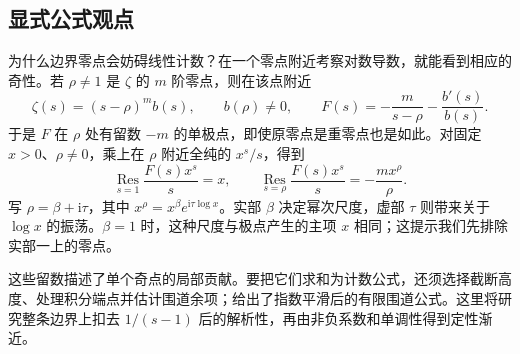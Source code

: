 \subsection{显式公式观点}
\label{b3:subsec:270203}

为什么边界零点会妨碍线性计数？在一个零点附近考察对数导数，就能看到相应的奇性。若 \(\rho\ne1\) 是 \(\zeta\) 的 \(m\) 阶零点，则在该点附近
\[
 \zeta(s)=(s-\rho)^m b(s),\qquad b(\rho)\ne0,
 \qquad F(s)=-\frac m{s-\rho}-\frac{b'(s)}{b(s)}.
\]
于是 \(F\) 在 \(\rho\) 处有留数 \(-m\) 的单极点，即使原零点是重零点也是如此。对固定 \(x>0\)、\(\rho\ne0\)，乘上在 \(\rho\) 附近全纯的 \(x^s/s\)，得到
\[
 \operatorname*{Res}_{s=1}\frac{F(s)x^s}{s}=x,
 \qquad
 \operatorname*{Res}_{s=\rho}\frac{F(s)x^s}{s}
 =-\frac{m x^\rho}{\rho}.
\]
写 \(\rho=\beta+\mathrm i\tau\)，其中 \(x^\rho=x^\beta e^{\mathrm i\tau\log x}\)。实部 \(\beta\) 决定幂次尺度，虚部 \(\tau\) 则带来关于 \(\log x\) 的振荡。\(\beta=1\) 时，这种尺度与极点产生的主项 \(x\) 相同；这提示我们先排除实部一上的零点。

这些留数描述了单个奇点的局部贡献。要把它们求和为计数公式，还须选择截断高度、处理积分端点并估计围道余项；给出了指数平滑后的有限围道公式。这里将研究整条边界上扣去 \(1/(s-1)\) 后的解析性，再由非负系数和单调性得到定性渐近。
